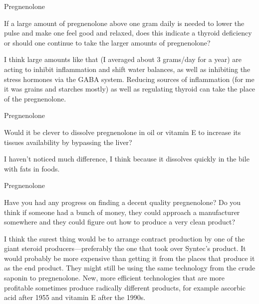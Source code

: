 \documentclass[11pt,oneside,openany,extrafontsizes]{memoir}
\begin{document}
\begin{qaexchange}{Pregnenolone}

    \begin{question}
        If a large amount of pregnenolone above one gram daily is needed to lower the pulse and make one feel good and relaxed, does this indicate a thyroid deficiency or should one continue to take the larger amounts of pregnenolone?
    \end{question}

    \begin{answer}
      I think large amounts like that (I averaged about 3 grams/day for a year) are acting to inhibit inflammation and shift water balances, as well as inhibiting the stress hormones via the GABA system. Reducing sources of inflammation (for me it was grains and starches mostly) as well as regulating thyroid can take the place of the pregnenolone.
    \end{answer}
\end{qaexchange}

\begin{qaexchange}{Pregnenolone}

    \begin{question}
        Would it be clever to dissolve pregnenolone in oil or vitamin E to increase its tissues availability by bypassing the liver?
    \end{question}

    \begin{answer}
      I haven't noticed much difference, I think because it dissolves quickly in the bile with fats in foods.
    \end{answer}
\end{qaexchange}

\begin{qaexchange}{Pregnenolone}

    \begin{question}
        Have you had any progress on finding a decent quality pregnenolone? Do you think if someone had a bunch of money, they could approach a manufacturer somewhere and they could figure out how to produce a very clean product?
    \end{question}

    \begin{answer}
      I think the surest thing would be to arrange contract production by one of the giant steroid producers—preferably the one that took over Syntec's product. It would probably be more expensive than getting it from the places that produce it as the end product. They might still be using the same technology from the crude saponin to pregnenolone. New, more efficient technologies that are more profitable sometimes produce radically different products, for example ascorbic acid after 1955 and vitamin E after the 1990s.
    \end{answer}
\end{qaexchange}
\end{document}
